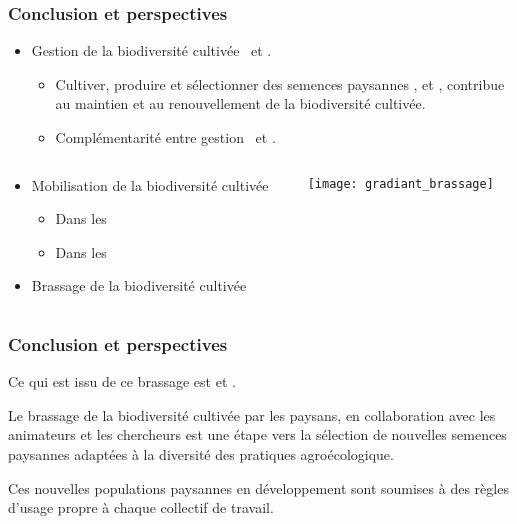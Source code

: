 \begin{frame}
\frametitle{Conclusion et perspectives}


\begin{itemize}
\item Gestion de la biodiversité cultivée \exsitu~et \insitu.
\begin{itemize}
\item Cultiver, produire et sélectionner des semences paysannes , et , contribue au maintien et au renouvellement de la biodiversité cultivée.
\item Complémentarité entre gestion \exsitu~et \insitu.
\end{itemize}
\end{itemize}

\begin{columns}

\begin{column}{.45\textwidth}
\begin{itemize}
\item Mobilisation de la biodiversité cultivée
\begin{itemize}
\item Dans les \CRBs
\item Dans les \MSPs
\end{itemize}

\item Brassage de la biodiversité cultivée
\end{itemize}

\end{column}

\begin{column}{.55\textwidth}
\begin{center}
\texttt{[image: gradiant\_brassage]}
\end{center}
\end{column}

\end{columns}



\end{frame}



\begin{frame}
\frametitle{Conclusion et perspectives}

Ce qui est issu de ce brassage est  et .

\begin{block}{}
\Large Le brassage de la biodiversité cultivée par les paysans, en collaboration avec les animateurs et les chercheurs est une étape vers la sélection de nouvelles semences paysannes adaptées à la diversité des pratiques agroécologique.
\end{block}

\begin{block}{}
\Large Ces nouvelles populations paysannes en développement sont soumises à des règles d'usage propre à chaque collectif de travail.
\end{block}

\end{frame}
